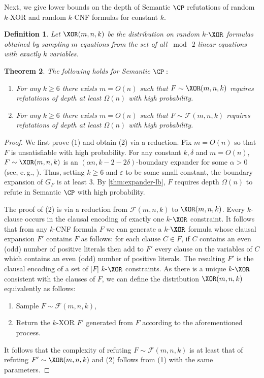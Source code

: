 \documentclass[11pt]{article}
\newtheorem{theorem}{Theorem}[section]
\newtheorem{definition}[theorem]{Definition}
\newcommand{\eg}{e.\,g.}
\begin{document}
Next, we give lower bounds on the depth of Semantic $\CP$ refutations of random $k$-XOR and random $k$-CNF formulas for constant $k$.
\begin{definition}
	Let $\XOR(m,n,k)$ be the distribution on random $k$-$\XOR$ formulas obtained by sampling $m$ equations from the set of all $\bmod\ 2$ linear equations with exactly $k$ variables.
\end{definition}
\begin{theorem}\label{thm:randomLB}
The following holds for Semantic $\CP:$
	\begin{enumerate}
		\item[$1$.] For any $k \geq 6$ there exists $m = O(n)$ such that $F \sim \XOR(m,n,k)$ requires refutations of depth at least $\Omega(n)$ with high probability.
		\item[$2$.] For any $k \geq 6$ there exists $m = O(n)$ such that $F \sim \mathcal{F}(m,n,k)$ requires refutations of depth at least $\Omega(n)$ with high probability.
	\end{enumerate}
\end{theorem}
%
\begin{proof}
	We first prove (1) and obtain (2) via a reduction. 
	Fix $m= O(n)$ so that $F$ is unsatisfiable with high probability. 
	For any constant $k,\delta$ and $m=O(n)$,  $F \sim \XOR(m,n,k)$ is an $(\alpha n, k-2-2\delta)$-boundary expander for some $\alpha > 0$ (see, \eg, \cite{BGHMP06,cs-resolution}). 
	Thus, setting $k \geq 6$ and $\varepsilon$ to be some small constant, the boundary expansion of $G_F$ is at least $3$. 
	By \autoref{thm:expander-lb}, $F$ requires depth $\Omega(n)$ to refute in Semantic $\CP$ with high probability.
	
	The proof of (2) is via a reduction from $\mathcal{F}(m,n,k)$ to $\XOR(m,n,k)$. 
	Every $k$-clause occurs in the clausal encoding of exactly one $k$-$\XOR$ constraint. 
	It follows that from any $k$-CNF formula $F$ we can generate a $k$-$\XOR$ formula whose clausal expansion $F'$ contains $F$ as follows:
	for each clause $C \in F$, if $C$ contains an even (odd) number of positive literals then add to $F'$ every clause on the variables of $C$ which contains an even (odd) number of positive literals. The resulting $F'$ is the clausal encoding of a set of $|F|$ $k$-$\XOR$ constraints. As there is a unique $k$-$\XOR$ consistent with the clauses of $F$, we can define the distribution $\XOR(m,n,k)$ equivalently as follows: 
	\begin{enumerate}
		\item Sample $F \sim \mathcal{F}(m,n,k)$,
		\item Return the $k$-XOR $F'$ generated from $F$ according to the aforementioned process.
	\end{enumerate}
	It follows that the complexity of refuting $F \sim \mathcal{F}(m,n,k)$ is at least that of refuting $F' \sim \XOR(m,n,k)$ and (2) follows from (1) with the same parameters. 
\end{proof}
\end{document}
